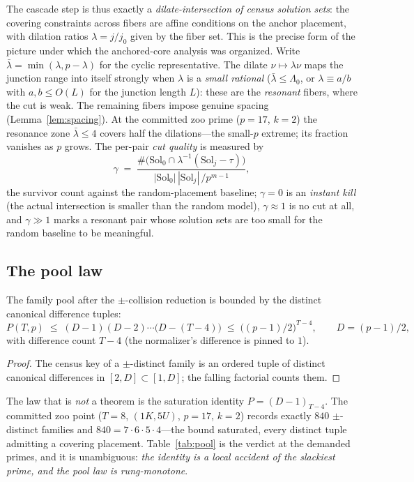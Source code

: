 The cascade step is thus exactly a \emph{dilate-intersection of census
solution sets}: the covering constraints across fibers are affine
conditions on the anchor placement, with dilation ratios
$\lambda=j/j_0$ given by the fiber set. This is the precise form of the
picture under which the anchored-core analysis was organized. Write
$\bar\lambda=\min(\lambda,p-\lambda)$ for the cyclic representative.
The dilate $\nu\mapsto\lambda\nu$ maps the junction range into itself
strongly when $\lambda$ is a \emph{small rational}
($\bar\lambda\le\Lambda_0$, or $\lambda\equiv a/b$ with $a,b\le O(L)$
for the junction length $L$): these are the \emph{resonant} fibers,
where the cut is weak. The remaining fibers impose genuine spacing
(Lemma~\ref{lem:spacing}). At the committed zoo prime ($p=17$, $k=2$)
the resonance zone $\bar\lambda\le 4$ covers half the dilations---the
small-$p$ extreme; its fraction vanishes as $p$ grows. The per-pair
\emph{cut quality} is measured by
\[
\gamma\;=\;\frac{\#\bigl(\mathrm{Sol}_0\cap\lambda^{-1}
(\mathrm{Sol}_j-\tau)\bigr)}
{|\mathrm{Sol}_0|\,|\mathrm{Sol}_j|\,/p^{m-1}},
\]
the survivor count against the random-placement baseline; $\gamma=0$ is
an \emph{instant kill} (the actual intersection is smaller than the
random model), $\gamma\approx 1$ is no cut at all, and $\gamma\gg 1$
marks a resonant pair whose solution sets are too small for the random
baseline to be meaningful.

\subsection{The pool law}\label{sec:scale-pool}

\begin{lemma}\label{lem:pool}
The family pool after the $\pm$-collision reduction is bounded by the
distinct canonical difference tuples:
\[
P(T,p)\;\le\;(D-1)(D-2)\cdots\bigl(D-(T-4)\bigr)
\;\le\;\bigl((p-1)/2\bigr)^{T-4},
\qquad D=(p-1)/2,
\]
with difference count $T-4$ (the normalizer's difference is pinned to
$1$).
\end{lemma}

\begin{proof}
The census key of a $\pm$-distinct family is an ordered tuple of
distinct canonical differences in $[2,D]\subset[1,D]$; the falling
factorial counts them.
\end{proof}

The law that is \emph{not} a theorem is the saturation identity
$P=(D-1)_{T-4}$. The committed zoo point ($T=8$, $(1K,5U)$, $p=17$,
$k=2$) records exactly $840$ $\pm$-distinct families and
$840=7\cdot6\cdot5\cdot4$---the bound saturated, every distinct tuple
admitting a covering placement. Table~\ref{tab:pool} is the verdict at
the demanded primes, and it is unambiguous: \emph{the identity is a
local accident of the slackiest prime, and the pool law is
rung-monotone}.

